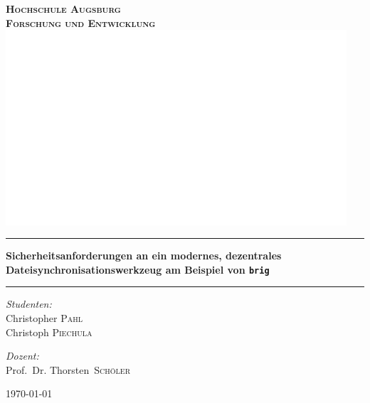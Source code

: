 \documentclass[11pt,ngerman,toc=listof,index=totoc]{scrreprt}
\date{\today}
\begin{document}
\begin{titlepage}
\pagecolor{titlepagecolor}
\begin{center}

\bf
\color{titlepagefontcolor}
\textsc{\huge Hochschule Augsburg}\\[1.5cm]
\textsc{\LARGE Forschung und Entwicklung}\\[0.5cm]
\vspace{1em}
\includegraphics[width=0.95\textwidth]{images/title.png}~\\[1cm]

\rule{\linewidth}{0.5mm}
{\huge \bfseries Sicherheitsanforderungen an ein modernes, dezentrales
    Dateisynchronisationswerkzeug am Beispiel von \frqq\texttt{brig}\flqq\\[0.4cm]}
\rule{\linewidth}{0.5mm}

\noindent
\begin{minipage}[t]{0.4\textwidth}
\begin{flushleft} \Large
\emph{Studenten:}\\
\textnormal{Christopher \textsc{Pahl}} \\
\textnormal{Christoph \textsc{Piechula}}
\end{flushleft}
\end{minipage}%
\begin{minipage}[t]{0.4\textwidth}
\begin{flushright} \Large
\emph{Dozent:} \\
\textnormal{Prof.\ Dr. Thorsten\  \textsc{Schöler}} \\
\end{flushright}
\end{minipage}

\vfill

{\large \today}
\end{center}
\end{titlepage}
\nopagecolor
\end{document}
